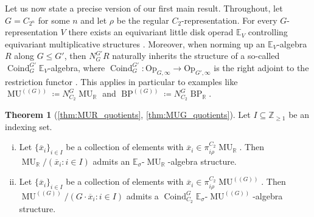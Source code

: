 \documentclass[a4paper, 10pt]{article}
\newcommand{\E}{\mathbb E}  %
\newcommand{\Z}{\mathbb{Z}}
\newcommand{\MU}{\operatorname{MU}}
\newcommand{\MUR}{{\MU_{\mathbb{R}}}}
\newcommand{\MUG}{{\MU^{(\!(G)\!)}}}
\newcommand{\BPG}{{\BP^{(\!(G)\!)}}}
\newcommand{\Op}{\mathrm{Op}}
\newcommand{\BP}{\operatorname{BP}}
\newcommand{\BPR}{{\BP_{\mathbb{R}}}}
\newcommand{\Coind}{\operatorname{Coind}}
\theoremstyle{definition}
\newtheorem{mainthm}{Theorem}
\begin{document}
Let us now state a precise version of our first main result. Throughout, let $G = C_{2^n}$ for some $n$ and let $\rho$ be the regular $C_2$-representation. For every $G$-representation $V$ there exists an equivariant little disk operad $\E_V$ controlling equivariant multiplicative structures \cite{blumberghill2015operadic, horev2019genuineequivariantfactorizationhomology, Hill22disks}. Moreover, when norming up an $\E_V$-algebra $R$ along $G \leq G'$, then $N_G^{G'} R$ naturally inherits the structure of a so-called $\Coind_{G}^{G'} \E_V$-algebra, where $\Coind_G^{G'} \colon \Op_{G, \infty} \to \Op_{G', \infty}$ is the right adjoint to the restriction functor \cite[Construction 2.2.5]{quinnZhu2026multiplicativeequivariantthomspectra}. This applies in particular to examples like $\MUG \coloneqq N_{C_2}^G \MUR$ and $\BPG \coloneqq N_{C_2}^G \BPR$.
\begin{mainthm}[\cref{thm:MUR_quotients}, \cref{thm:MUG_quotients}]\label{main:MUR_quotients}
    Let $I \subseteq \Z_{\geq 1}$ be an indexing set.
    \begin{enumerate}[(i)]
        \item Let \(\{\overline{x}_{i}\}_{i\in I}\) be a collection of elements with \(\overline{x}_i\in \pi^{C_2}_{i\rho}\MUR\).
        Then \(\MUR/(\overline{x}_i:i\in I)\) admits an \(\E_\sigma\)-\(\MUR\)-algebra structure.
        \item Let \(\{\overline{x}_{i}\}_{i\in I}\) be a collection of elements with \(\overline{x}_i\in \pi^{C_2}_{i\rho}\MUG\).
        Then \(\MUG/(G\cdot \overline{x}_i:i\in I)\) admits a \(\Coind^G_{C_2}\E_\sigma\)-\(\MUG\)-algebra structure.
    \end{enumerate}
\end{mainthm}
\end{document}
